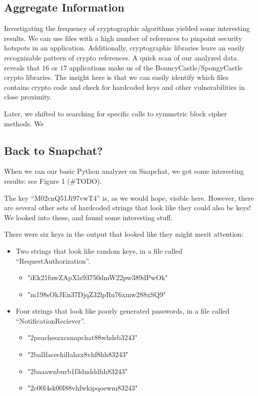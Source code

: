 \documentclass[11pt]{article}
\numberwithin{theorem}{subsection}
\begin{document}
\subsection{Aggregate Information}

  Investigating the frequency of cryptographic algorithms yielded some interesting results. We can use
files with a high number of references to pinpoint security hotspots in an application. Additionally, 
cryptographic libraries leave an easily recognizable pattern of crypto references. A quick scan
of our analyzed data reveals that $16$ or $17$ applications make us of the BouncyCastle/SpongyCastle crypto
libraries. The insight here is that we can easily identify which files contains crypto code and check
for hardcoded keys and other vulnerabilities in close proximity.

  Later, we shifted to searching for specific calls to symmetric block cipher methods. We 

\subsection{Back to Snapchat?}

When we ran our basic Python analyzer on Snapchat, we got some interesting results: see Figure 1 (\#TODO).

The key ``M02cnQ51Ji97vwT4'' is, as we would hope, visible here.  However, there are several other sets of
hardcoded strings that look like they could also be keys!  We looked into these, and found some interesting stuff.

There were six keys in the output that looked like they might merit attention:

\begin{itemize}
\item Two strings that look like random keys, in a file called ``RequestAuthorization''. 
\begin{itemize}
\item "iEk21fuwZApXlz93750dmW22pw389dPwOk"
\item "m198sOkJEn37DjqZ32lpRu76xmw288xSQ9"
\end{itemize}
\item Four strings that look like poorly generated passwords, in a file called ``NotificationReciever''.
\begin{itemize}
\item "2peacheszxcsnapchat88whdsb3243"
\item "2ballfacechillahzx8vhf8hh83243"
\item "2baaawnburb1f3dndddhh83243"
\item "2c00l4sk00l88vhfwkipqoewm83243"
\end{itemize}
\end{itemize}
\end{document}
